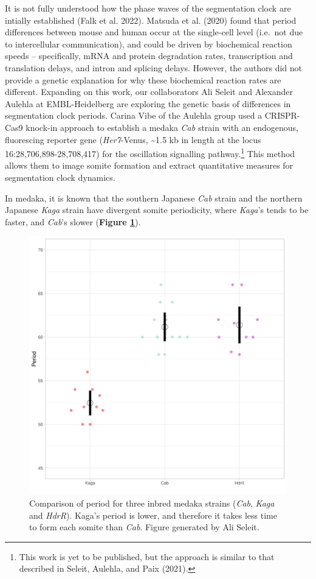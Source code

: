 \documentclass[
]{book}
\begin{document}
It is not fully understood how the phase waves of the segmentation clock are intially established (Falk et al. 2022). Matsuda et al. (2020) found that period differences between mouse and human occur at the single-cell level (i.e.~not due to intercellular communication), and could be driven by biochemical reaction speeds -- specifically, mRNA and protein degradation rates, transcription and translation delays, and intron and splicing delays. However, the authors did not provide a genetic explanation for why these biochemical reaction rates are different. Expanding on this work, our collaborators Ali Seleit and Alexander Aulehla at EMBL-Heidelberg are exploring the genetic basis of differences in segmentation clock periods. Carina Vibe of the Aulehla group used a CRISPR-Cas9 knock-in approach to establish a medaka \emph{Cab} strain with an endogenous, fluorescing reporter gene (\emph{Her7}-Venus, \textasciitilde1.5 kb in length at the locus 16:28,706,898-28,708,417) for the oscillation signalling pathway.\footnote{This work is yet to be published, but the approach is similar to that described in Seleit, Aulehla, and Paix (2021).} This method allows them to image somite formation and extract quantitative measures for segmentation clock dynamics.

In medaka, it is known that the southern Japanese \emph{Cab} strain and the northern Japanese \emph{Kaga} strain have divergent somite periodicity, where \emph{Kaga}'s tends to be faster, and \emph{Cab}'s slower (\textbf{Figure \ref{fig:F0-Cab-Kaga-HdrR}}).



\begin{figure}
\includegraphics[width=1\linewidth]{figs/somites/ali_period_F0_Cab_Kaga} \caption{Comparison of period for three inbred medaka strains (\emph{Cab}, \emph{Kaga} and \emph{HdrR}). Kaga's period is lower, and therefore it takes less time to form each somite than \emph{Cab}. Figure generated by Ali Seleit.}\label{fig:F0-Cab-Kaga-HdrR}
\end{figure}
\end{document}
